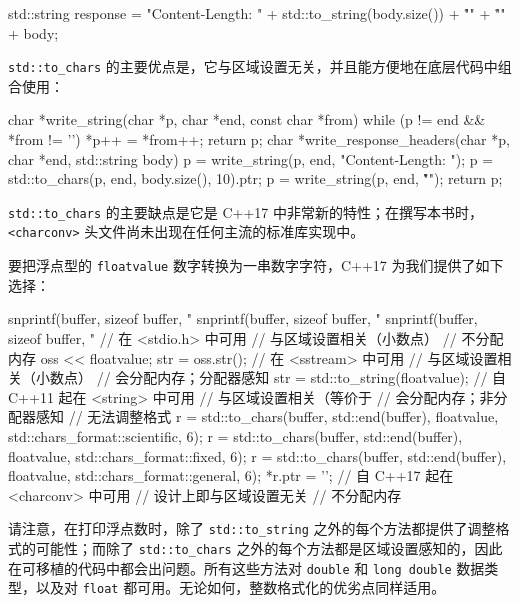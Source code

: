 \begin{codebox}[cpp]
    std::string response =
      "Content-Length: " + std::to_string(body.size()) + "\r\n" +
      "\r\n" +
      body;
\end{codebox}

\texttt{std::\allowbreak{}to\_\allowbreak{}chars} 的主要优点是，它与区域设置无关，并且能方便地在底层代码中组合使用：

\begin{codebox}[cpp]
    char *write_string(char *p, char *end, const char *from)
    {
      while (p != end && *from != '\0') *p++ = *from++;
      return p;
    }
    char *write_response_headers(char *p, char *end, std::string body)
    {
      p = write_string(p, end, "Content-Length: ");
      p = std::to_chars(p, end, body.size(), 10).ptr;
      p = write_string(p, end, "\r\n\r\n");
      return p;
    }
\end{codebox}

\texttt{std::\allowbreak{}to\_\allowbreak{}chars} 的主要缺点是它是 C++17 中非常新的特性；在撰写本书时，\texttt{<charconv>\allowbreak{}} 头文件尚未出现在任何主流的标准库实现中。

要把浮点型的 \texttt{floatvalue} 数字转换为一串数字字符，C++17 为我们提供了如下选择：

\begin{codebox}[cpp]
    snprintf(buffer, sizeof buffer, "%
    snprintf(buffer, sizeof buffer, "%
    snprintf(buffer, sizeof buffer, "%
      // 在 <stdio.h> 中可用
      // 与区域设置相关（小数点）
      // 不分配内存
    oss << floatvalue;
    str = oss.str();
      // 在 <sstream> 中可用
      // 与区域设置相关（小数点）
      // 会分配内存；分配器感知
    str = std::to_string(floatvalue);
      // 自 C++11 起在 <string> 中可用
      // 与区域设置相关（等价于 %
      // 会分配内存；非分配器感知
      // 无法调整格式
    r = std::to_chars(buffer, std::end(buffer), floatvalue,
                      std::chars_format::scientific, 6);
    r = std::to_chars(buffer, std::end(buffer), floatvalue,
                      std::chars_format::fixed, 6);
    r = std::to_chars(buffer, std::end(buffer), floatvalue,
                      std::chars_format::general, 6);
    *r.ptr = '\0';
      // 自 C++17 起在 <charconv> 中可用
      // 设计上即与区域设置无关
      // 不分配内存
\end{codebox}

请注意，在打印浮点数时，除了 \texttt{std::\allowbreak{}to\_\allowbreak{}string} 之外的每个方法都提供了调整格式的可能性；而除了 \texttt{std::\allowbreak{}to\_\allowbreak{}chars} 之外的每个方法都是区域设置感知的，因此在可移植的代码中都会出问题。所有这些方法对 \texttt{double} 和 \texttt{long double} 数据类型，以及对 \texttt{float} 都可用。无论如何，整数格式化的优劣点同样适用。

